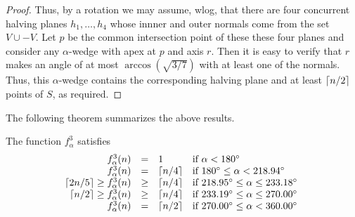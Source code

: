 \documentclass[lotsofwhite]{patmorin}
\begin{document}
{\begin{proof}
Thus, by a rotation we may assume, wlog, that there are four
concurrent halving planes $h_1,\ldots,h_4$ whose innner and outer
normals come from the set $V\cup -V$.  Let $p$ be the common
intersection point of these these four planes and consider any
$\alpha$-wedge with apex at $p$ and axis $r$.  Then it is easy to
verify that $r$ makes an angle of at most $\arccos(\sqrt{3/7})$ with
at least one of the normals.  Thus, this $\alpha$-wedge contains the
corresponding halving plane and at least $\left\lceil n/2 \right\rceil$ points of $S$,
as required.
\end{proof}
}


The following theorem summarizes the above results.

\begin{thm}
The function $f_\alpha^3$ satisfies
\[\begin{array}{rcll}
  f^3_\alpha(n) & = & 1 & \mbox{if $\alpha < 180^\circ$} \\
  f^3_\alpha(n) & = & \left\lceil n/4 \right\rceil & 
    \mbox{if $180^\circ \le \alpha < 218.94^\circ$} \\
\left\lceil 2n/5 \right\rceil\ge  f^3_\alpha(n) & \ge & \left\lceil n/4 \right\rceil & 
    \mbox{if $218.95^\circ \le \alpha \le 233.18^\circ$ } \\
\left\lceil n/2 \right\rceil\ge  f^3_\alpha(n) & \ge & \left\lceil n/4 \right\rceil & 
    \mbox{if $233.19^\circ \le \alpha \le 270.00^\circ$ } \\
  f^3_\alpha(n) & = & \left\lceil n/2 \right\rceil & 
    \mbox{if $270.00^\circ\le \alpha < 360.00^\circ$} \\
\end{array}\]
\end{thm}
\end{document}
